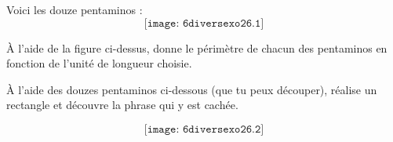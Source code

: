 Voici les douze pentaminos :
\[\texttt{[image: 6diversexo26.1]}\]
\begin{myenumerate}
  \item \`A l'aide de la figure ci-dessus, donne le périmètre de
    chacun des pentaminos en fonction de l'unité de longueur choisie.
  \item \`A l'aide des douzes pentaminos ci-dessous (que tu peux
    découper), réalise un rectangle et découvre la phrase qui y est
    cachée.
\end{myenumerate}
\[\texttt{[image: 6diversexo26.2]}\]